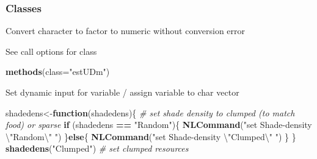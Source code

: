 \documentclass[10,portrait]{article}
\newenvironment{Shaded}{\begin{snugshade}}{\end{snugshade}}
\newcommand{\KeywordTok}[1]{\textcolor[rgb]{0.13,0.29,0.53}{\textbf{#1}}}
\newcommand{\DataTypeTok}[1]{\textcolor[rgb]{0.13,0.29,0.53}{#1}}
\newcommand{\CharTok}[1]{\textcolor[rgb]{0.31,0.60,0.02}{#1}}
\newcommand{\StringTok}[1]{\textcolor[rgb]{0.31,0.60,0.02}{#1}}
\newcommand{\CommentTok}[1]{\textcolor[rgb]{0.56,0.35,0.01}{\textit{#1}}}
\newcommand{\OtherTok}[1]{\textcolor[rgb]{0.56,0.35,0.01}{#1}}
\newcommand{\ControlFlowTok}[1]{\textcolor[rgb]{0.13,0.29,0.53}{\textbf{#1}}}
\newcommand{\OperatorTok}[1]{\textcolor[rgb]{0.81,0.36,0.00}{\textbf{#1}}}
\newcommand{\NormalTok}[1]{#1}
\begin{document}
\subsubsection{Classes}\label{classes}

Convert character to factor to numeric without conversion error

\begin{Shaded}
\end{Shaded}

See call options for class

\begin{Shaded}
\begin{Highlighting}[]
\KeywordTok{methods}\NormalTok{(}\DataTypeTok{class=}\StringTok{"estUDm"}\NormalTok{)}
\end{Highlighting}
\end{Shaded}

Set dynamic input for variable / assign variable to char vector

\begin{Shaded}
\begin{Highlighting}[]
\NormalTok{shadedens<-}\ControlFlowTok{function}\NormalTok{(shadedens)\{ }\CommentTok{# set shade density to clumped (to match food) or sparse }
  \ControlFlowTok{if}\NormalTok{ (shadedens }\OperatorTok{==}\StringTok{ "Random"}\NormalTok{)\{}
    \KeywordTok{NLCommand}\NormalTok{(}\StringTok{"set Shade-density }\CharTok{\textbackslash{}"}\StringTok{Random}\CharTok{\textbackslash{}"}\StringTok{ "}\NormalTok{) }
\NormalTok{    \}}\ControlFlowTok{else}\NormalTok{\{}
    \KeywordTok{NLCommand}\NormalTok{(}\StringTok{"set Shade-density }\CharTok{\textbackslash{}"}\StringTok{Clumped}\CharTok{\textbackslash{}"}\StringTok{ "}\NormalTok{) }
\NormalTok{    \}}
\NormalTok{  \}}
\KeywordTok{shadedens}\NormalTok{(}\StringTok{"Clumped"}\NormalTok{) }\CommentTok{# set clumped resources}
\end{Highlighting}
\end{Shaded}
\end{document}
